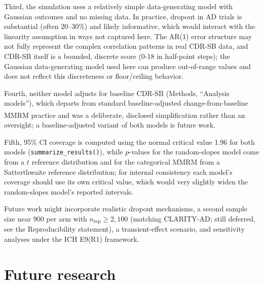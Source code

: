 \documentclass[
  11pt,
]{article}
\begin{document}
Third, the simulation uses a relatively simple data-generating
model with Gaussian outcomes and no missing data. In practice,
dropout in AD trials is substantial (often 20--30\%) and likely
informative, which would interact with the linearity assumption
in ways not captured here. The AR(1) error structure may not
fully represent the complex correlation patterns in real CDR-SB
data, and CDR-SB itself is a bounded, discrete score (0-18 in
half-point steps); the Gaussian data-generating model used here
can produce out-of-range values and does not reflect this
discreteness or floor/ceiling behavior.

Fourth, neither model adjusts for baseline CDR-SB (Methods,
``Analysis models''), which departs from standard
baseline-adjusted change-from-baseline MMRM practice\textsuperscript{} and was a deliberate,
disclosed simplification rather than an oversight; a
baseline-adjusted variant of both models is future work.

Fifth, 95\% CI coverage is computed using the normal critical
value 1.96 for both models (\texttt{summarize\_results()}), while
\(p\)-values for the random-slopes model come from a \(t\)
reference distribution and for the categorical MMRM from a
Satterthwaite reference distribution; for internal consistency
each model's coverage should use its own critical value, which
would very slightly widen the random-slopes model's reported
intervals.

Future work might incorporate realistic dropout mechanisms, a
second sample size near 900 per arm with \(n_{\mathrm{rep}} \geq
2{,}100\) (matching CLARITY-AD; still deferred, see the
Reproducibility statement), a transient-effect scenario, and
sensitivity analyses under the ICH E9(R1) framework.

\section{Future research}\label{future-research}
\end{document}
